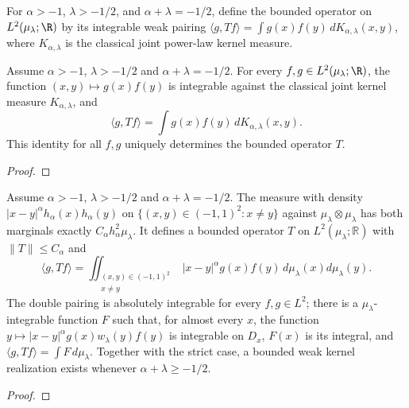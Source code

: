 \begin{supporting}
\begin{definition}
\label{def:power-law-critical-operator}
\leanok
For $\alpha>-1$, $\lambda>-1/2$, and $\alpha+\lambda=-1/2$, define the
bounded operator on $L^2(\mu_\lambda;\R)$ by its integrable weak pairing
$\langle g,Tf\rangle=\int g(x)f(y)\,dK_{\alpha,\lambda}(x,y)$,
where $K_{\alpha,\lambda}$ is the classical joint power-law kernel measure.
\end{definition}
\begin{theorem}
\label{thm:power-law-critical-operator}
\leanok
Assume $\alpha>-1$, $\lambda>-1/2$ and $\alpha+\lambda=-1/2$. For every $f,g\in L^2(\mu_\lambda;\R)$,
the function $(x,y)\mapsto g(x)f(y)$ is integrable against the classical
joint kernel measure $K_{\alpha,\lambda}$, and
\[
 \langle g,Tf\rangle=\int g(x)f(y)\,dK_{\alpha,\lambda}(x,y).
\]
This identity for all $f,g$ uniquely determines the bounded operator $T$.
\end{theorem}
\begin{proof}
\leanok
\end{proof}

\begin{theorem}
\label{thm:power-law-critical-l2}
\leanok
Assume $\alpha>-1$, $\lambda>-1/2$ and $\alpha+\lambda=-1/2$.
The measure with density $|x-y|^\alpha h_\alpha(x)h_\alpha(y)$
on $\{(x,y)\in(-1,1)^2:x\ne y\}$ against $\mu_\lambda\otimes\mu_\lambda$
has both marginals exactly $C_\alpha h_\alpha^2\mu_\lambda$.
It defines a bounded operator $T$ on $L^2(\mu_\lambda;\mathbb R)$ with
$\|T\|\le C_\alpha$ and
\[
 \langle g,Tf\rangle=
 \iint_{\substack{(x,y)\in(-1,1)^2\\x\ne y}} |x-y|^\alpha g(x)f(y)\,d\mu_\lambda(x)d\mu_\lambda(y).
\]
The double pairing is absolutely integrable for every $f,g\in L^2$;
there is a $\mu_\lambda$-integrable function $F$ such that, for almost every $x$,
the function $y\mapsto |x-y|^\alpha g(x)w_\lambda(y)f(y)$ is integrable on $D_x$, $F(x)$ is its integral, and
$\langle g,Tf\rangle=\int F\,d\mu_\lambda$.
Together with the strict case, a bounded weak kernel realization exists whenever
$\alpha+\lambda\ge-1/2$.
\end{theorem}
\begin{proof}
\leanok
\end{proof}


\end{supporting}
